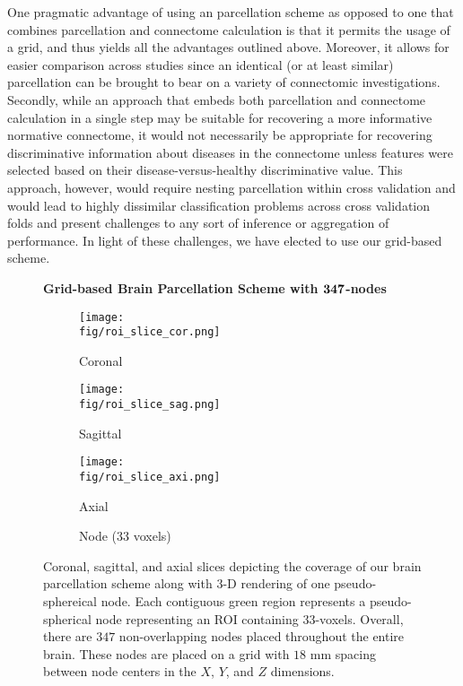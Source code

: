 One pragmatic advantage of using an \apriori parcellation scheme as opposed to one that combines parcellation and connectome calculation is that it permits the usage of a grid, and thus yields all the advantages outlined above. 
Moreover, it allows for easier comparison across studies since an identical (or at least similar) parcellation can be brought to bear on a variety of connectomic investigations. 
Secondly, while an approach that embeds both parcellation and connectome calculation in a single step may be suitable for recovering a more informative normative connectome, it would not necessarily be appropriate for recovering discriminative information about diseases in the connectome unless features were selected based on their disease-versus-healthy discriminative value. 
This approach, however, would require nesting parcellation within cross validation and would lead to highly dissimilar classification problems across cross validation folds and present challenges to any sort of inference or aggregation of performance. 
In light of these challenges, we have elected to use our \apriori grid-based scheme.

\renewcommand{\imwidth}  {0.2425\linewidth}
\renewcommand{\imwidthh}  {0.19\linewidth}
\begin{figure}[t!]
	\centering
	\textbf{\large{Grid-based Brain Parcellation Scheme with $\bm{347}$-nodes}} \vspace{8pt}\\
	\begin{subfigure}[t]{\imwidth}
		\centering
		\texttt{[image: \\fig/roi\_slice\_cor.png]}
		\caption{Coronal}
	\end{subfigure}\hspace{12pt}
	\begin{subfigure}[t]{\imwidth}
		\centering
		\texttt{[image: \\fig/roi\_slice\_sag.png]}
		\caption{Sagittal}
	\end{subfigure}\hspace{12pt}
	\begin{subfigure}[t]{\imwidth}
		\centering
		\texttt{[image: \\fig/roi\_slice\_axi.png]}
		\caption{Axial}
	\end{subfigure}
	\begin{subfigure}[t]{\imwidthh}
		\centering
		\caption{Node (33 voxels)}
	\end{subfigure}
	\caption{
	Coronal, sagittal, and axial slices depicting the coverage of our brain parcellation scheme along with $3$-D rendering of one pseudo-sphereical node. 
	Each contiguous green region represents a pseudo-spherical node representing an ROI containing $33$-voxels.
	Overall, there are $347$ non-overlapping nodes placed throughout the entire brain.
	These nodes are placed on a grid with $18$ mm spacing between node centers in the $X$, $Y$, and $Z$ dimensions.
	}
	\label{fig:roi,grid,slice}
\end{figure}
